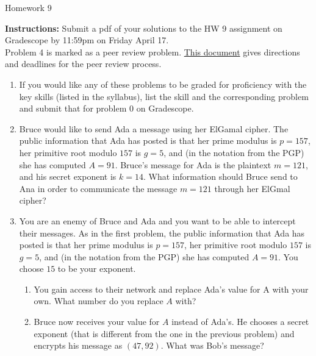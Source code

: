 \documentclass[12pt]{article}
\begin{document}
\begin{center}
{\Large Homework 9}\\


\end{center}
{\bf Instructions:} Submit a pdf of your solutions to the HW 9 assignment on Gradescope by 11:59pm on Friday April 17. \\[3pt]

\noindent Problem 4 is marked as a peer review problem. \href{https://docs.google.com/document/d/1jSw9pmMJJFUx_6dTkcUi4k4HJNIrrIIgs9zdWhAycx0/edit?usp=drive_link}{This document} gives directions and deadlines for the peer review process.
\\[3pt]


\begin{enumerate}
\item[0.] If you would like any of these problems to be graded for proficiency with the key skills (listed in the syllabus), list the skill and the corresponding problem and submit that for problem 0 on Gradescope.  

 \item Bruce would like to send Ada a message using her ElGamal cipher.  The public information that Ada has posted is that her prime modulus is $p = 157$, her primitive root modulo $157$ is $g = 5$, and (in the notation from the PGP) she has computed $A = 91$.    Bruce's message for Ada is the plaintext $m = 121$, and his secret exponent is $k = 14$.  What information should Bruce send to Ana in order to communicate the message $m = 121$ through her ElGmal cipher?  
 
 \item You are an enemy of Bruce and Ada and you want to be able to intercept their messages. As in the first problem,  the public information that Ada has posted is that her prime modulus is $p = 157$, her primitive root modulo $157$ is $g = 5$, and (in the notation from the PGP) she has computed $A = 91$.  You choose $15$ to be your exponent. 
\begin{enumerate}
\item You gain access to their network and replace Ada's value for A with your own. What number do you replace $A$ with?
\item Bruce now receives your value for $A$ instead of Ada's. He chooses a secret exponent (that is different from the one in the previous problem) and encrypts his message as $(47,92)$. What was Bob's message?
\end{enumerate}


\end{enumerate}
\end{document}
